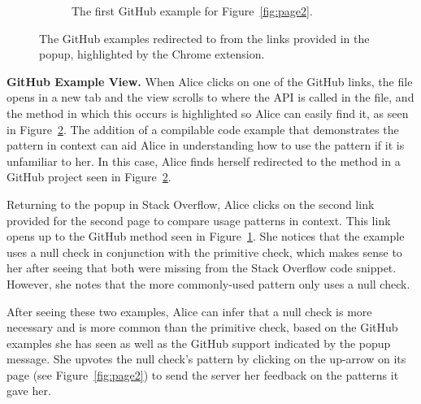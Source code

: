 \begin{figure}[t!]
\begin{subfigure}[t]{0.48\textwidth}
  \caption{The first GitHub example for Figure~\ref{fig:page2}.\protect\footnotemark}
  \vspace{.1in}
  \label{fig:github2}
  \end{subfigure}
  \hfill
\caption{The GitHub examples redirected to from the links provided in the popup, highlighted by the Chrome extension.}
\label{fig:github_examples}
\end{figure}


{\bf GitHub Example View.} When Alice clicks on one of the GitHub links, the file opens in a new tab and the view scrolls to where the API is called in the file, and the method in which this occurs is highlighted so Alice can easily find it, as seen in Figure~\ref{fig:github_examples}. The addition of a compilable code example that demonstrates the pattern in context can aid Alice in understanding how to use the pattern if it is unfamiliar to her. In this case, Alice finds herself redirected to the method in a GitHub project seen in Figure~\ref{fig:github_examples}.

Returning to the popup in Stack Overflow, Alice clicks on the second link provided for the second page to compare usage patterns in context. This link opens up to the GitHub method seen in Figure~\ref{fig:github2}. She notices that the example uses a null check in conjunction with the primitive check, which makes sense to her after seeing that both were missing from the Stack Overflow code snippet. However, she notes that the more commonly-used pattern only uses a null check.

After seeing these two examples, Alice can infer that a null check is more necessary and is more common than the primitive check, based on the GitHub examples she has seen as well as the GitHub support indicated by the popup message. She upvotes the null check's pattern by clicking on the up-arrow on its page (see Figure~\ref{fig:page2}) to send the server her feedback on the patterns it gave her.


